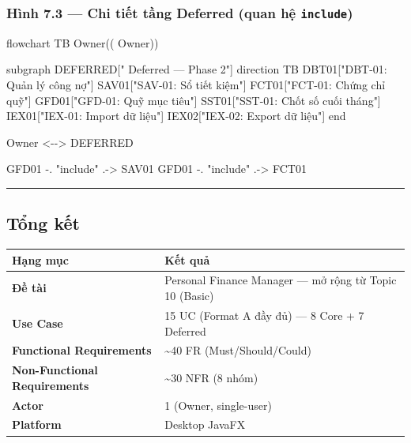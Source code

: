 \documentclass[11pt,a4paper]{article}
\newenvironment{Shaded}{}{}
\newcommand{\NormalTok}[1]{#1}
\newcounter{none}
\newcommand{\faintline}{\noalign{\global\arrayrulecolor{faintgray}}\hline\noalign{\global\arrayrulecolor{black}}} %
\begin{document}
\subsubsection{\texorpdfstring{Hình 7.3 --- Chi tiết tầng Deferred (quan hệ \texttt{include})}{Hình 7.3 --- Chi tiết tầng Deferred (quan hệ include)}}\label{huxecnh-7.3-chi-tiux1ebft-tux1ea7ng-deferred-quan-hux1ec7-include}

\begin{Shaded}
\begin{Highlighting}[]
\NormalTok{flowchart TB}
\NormalTok{    Owner(( Owner))}

\NormalTok{    subgraph DEFERRED[" Deferred — Phase 2"]}
\NormalTok{        direction TB}
\NormalTok{        DBT01["DBT{-}01: Quản lý công nợ"]}
\NormalTok{        SAV01["SAV{-}01: Sổ tiết kiệm"]}
\NormalTok{        FCT01["FCT{-}01: Chứng chỉ quỹ"]}
\NormalTok{        GFD01["GFD{-}01: Quỹ mục tiêu"]}
\NormalTok{        SST01["SST{-}01: Chốt số cuối tháng"]}
\NormalTok{        IEX01["IEX{-}01: Import dữ liệu"]}
\NormalTok{        IEX02["IEX{-}02: Export dữ liệu"]}
\NormalTok{    end}

\NormalTok{    Owner \textless{}{-}{-}\textgreater{} DEFERRED}

\NormalTok{    GFD01 {-}. "include" .{-}\textgreater{} SAV01}
\NormalTok{    GFD01 {-}. "include" .{-}\textgreater{} FCT01}
\end{Highlighting}
\end{Shaded}

\begin{center}\rule{1.0\linewidth}{0.5pt}\end{center}

\subsection{Tổng kết}\label{tux1ed5ng-kux1ebft}

{\def\LTcaptype{none}
\begin{longtable}[]{@{}ll@{}}
\toprule\noalign{}
Hạng mục & Kết quả \\
\midrule\noalign{}
\endhead
\bottomrule\noalign{}
\endlastfoot
\textbf{Đề tài} & Personal Finance Manager --- mở rộng từ Topic 10 (Basic) \\ \faintline
\textbf{Use Case} & 15 UC (Format A đầy đủ) --- 8 Core + 7 Deferred \\ \faintline
\textbf{Functional Requirements} & \textasciitilde40 FR (Must/Should/Could) \\ \faintline
\textbf{Non-Functional Requirements} & \textasciitilde30 NFR (8 nhóm) \\ \faintline
\textbf{Actor} & 1 (Owner, single-user) \\ \faintline
\textbf{Platform} & Desktop JavaFX \\
\end{longtable}
}
\end{document}
